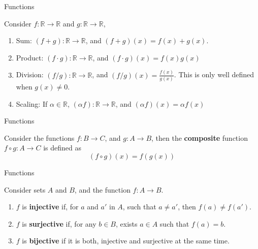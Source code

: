 \documentclass[aspectratio=169]{beamer}
\begin{document}
\begin{frame}{Functions}
    
    \begin{definition}
        Consider $f:\mathds{R}\rightarrow\mathds{R}$ and $g:\mathds{R}\rightarrow\mathds{R}$,
        \begin{enumerate}
            \item Sum: $(f+g):\mathds{R}\rightarrow\mathds{R}$, and $(f+g)(x)=f(x)+g(x)$.
            \item Product: $(f\cdot g):\mathds{R}\rightarrow\mathds{R}$, and $(f\cdot g)(x)=f(x)g(x)$
            \item Division: $(f/g):\mathds{R}\rightarrow\mathds{R}$, and $(f/g)(x)=\frac{f(x)}{g(x)}$. This is only well defined when $g(x)\neq 0$.
            \item Scaling: If $\alpha\in\mathds{R}$, $(\alpha f):\mathds{R}\rightarrow\mathds{R}$, and $(\alpha f)(x)=\alpha f(x)$
        \end{enumerate}
    \end{definition}
    
\end{frame}

\begin{frame}{Functions}
    \begin{definition}
        Consider the functions $f:B\rightarrow C$, and $g:A\rightarrow B$, then the \textbf{composite} function $f \circ g:A\rightarrow C$ is defined as
        $$(f\circ g)(x) = f(g(x))$$
    \end{definition}
\end{frame}

\begin{frame}{Functions}
    \begin{definition}
        Consider sets $A$ and $B$, and the function $f:A\rightarrow B$.
        \begin{enumerate}
            \item $f$ is \textbf{injective} if, for $a$ and $a'$ in $A$, such that $a\neq a'$, then $f(a)\neq f(a')$.
            \item $f$ is \textbf{surjective} if, for any $b\in B$, exists $a\in A$ such that $f(a)=b$.
            \item $f$ is \textbf{bijective} if it is both, injective and surjective at the same time.
        \end{enumerate}
    \end{definition}
\end{frame}
\end{document}
